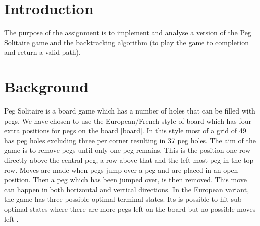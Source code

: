 \documentclass[a4paper]{article}
\begin{document}
\begin{titlepage}

 

\vfill %

\end{titlepage}

\clearpage
\setcounter{page}{1}



\section{Introduction}
The purpose of the assignment is to implement and analyse a version of the Peg Solitaire game and the backtracking algorithm (to play the game to completion and return a valid path).

\section{Background}
Peg Solitaire is a board game which has a number of holes that can be filled with pegs. We have chosen to use the European/French style of board which has four extra positions for pegs on the board \ref{board}. In this style most of a grid of 49 has peg holes excluding three per corner resulting in 37 peg holes. The aim of the game is to remove pegs until only one peg remains. This is the position one row directly above the central peg, a row above that and the left most peg in the top row. Moves are made when pegs jump over a peg and are placed in an open position. Then a peg which has been jumped over, is then removed. This move can happen in both horizontal and vertical directions. In the European variant, the game has three possible optimal terminal states. Its is possible to hit sub-optimal states where there are more pegs left on the board but no possible moves left \cite{harder}. 
\end{document}
